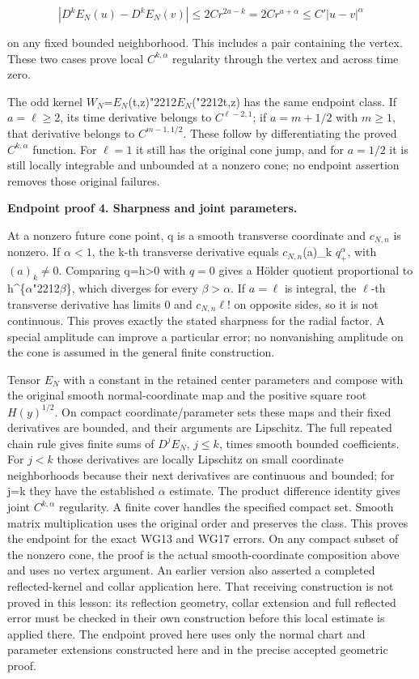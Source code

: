 \documentclass[
  11pt,
]{article}
\begin{document}
\[
 |D^kE_N(u)-D^kE_N(v)|
 \leq 2C r^{2a-k}
 =2C r^{a+\alpha}\leq C'|u-v|^\alpha
 \tag{EH5}
\]

on any fixed bounded neighborhood. This includes a pair containing the
vertex. These two cases prove local \(C^{k,\alpha }\) regularity through
the vertex and across time zero.

The odd kernel \(W_N\)=\(E_N\)(t,z){\ReaderSymbols\char"2212}\(E_N\)({\ReaderSymbols\char"2212}t,z) has the same endpoint
class. If \(a=\ell \geq 2\), its time derivative belongs to
\(C^{\ell -2,1}\); if \(a=m+1/2\) with \(m\geq 1\), that derivative
belongs to \(C^{m-1,1/2}\). These follow by differentiating the proved
\(C^{k,\alpha }\) function. For \(\ell =1\) it still has the original
cone jump, and for \(a=1/2\) it is still locally integrable and
unbounded at a nonzero cone; no endpoint assertion removes those
original failures.

\textbf{Endpoint proof 4. Sharpness and joint parameters.}

At a nonzero future cone point, q is a smooth transverse coordinate and
\(c_{N,n}\) is nonzero. If \(\alpha <1\), the k-th transverse derivative
equals \(c_{N,n}\)(a)\_k \(q_+^\alpha \), with \((a)_k\ne 0\). Comparing
q=h\textgreater0 with \(q=0\) gives a Hölder quotient proportional to
h\^{}\{\ensuremath{\alpha}{\ReaderSymbols\char"2212}\ensuremath{\beta}\}, which diverges for every \(\beta >\alpha \). If \(a=\ell \)
is integral, the \ensuremath{\ell}-th transverse derivative has limits 0 and
\(c_{N,n}\ell !\) on opposite sides, so it is not continuous. This
proves exactly the stated sharpness for the radial factor. A special
amplitude can improve a particular error; no nonvanishing amplitude on
the cone is assumed in the general finite construction.

Tensor \(E_N\) with a constant in the retained center parameters and
compose with the original smooth normal-coordinate map and the positive
square root \(H(y)^{1/2}\). On compact coordinate/parameter sets these
maps and their fixed derivatives are bounded, and their arguments are
Lipschitz. The full repeated chain rule gives finite sums of \(D^jE_N\),
\(j\leq k\), times smooth bounded coefficients. For \(j<k\) those
derivatives are locally Lipschitz on small coordinate neighborhoods
because their next derivatives are continuous and bounded; for j=k they
have the established \ensuremath{\alpha} estimate. The product difference identity gives
joint \(C^{k,\alpha }\) regularity. A finite cover handles the specified
compact set. Smooth matrix multiplication uses the original order and
preserves the class. This proves the endpoint for the exact WG13 and
WG17 errors. On any compact subset of the nonzero cone, the proof is the
actual smooth-coordinate composition above and uses no vertex argument.
An earlier version also asserted a completed reflected-kernel and collar
application here. That receiving construction is not proved in this
lesson: its reflection geometry, collar extension and full reflected
error must be checked in their own construction before this local
estimate is applied there. The endpoint proved here uses only the normal
chart and parameter extensions constructed here and in the precise
accepted geometric proof.
\end{document}
